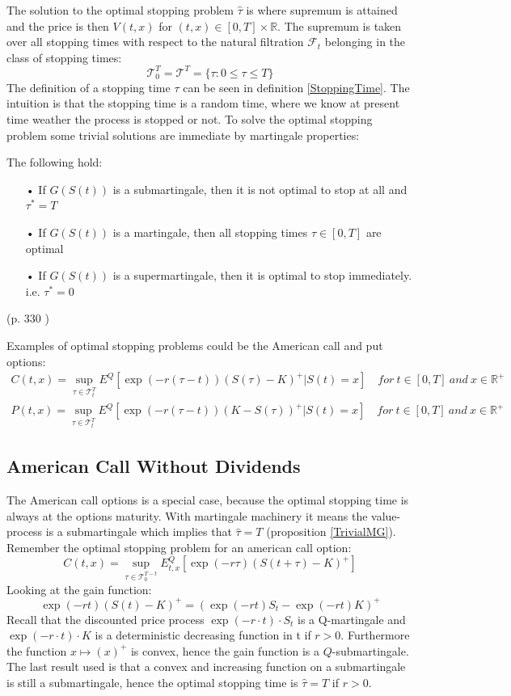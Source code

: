 The solution to the optimal stopping problem $\hat{\tau}$ is where supremum is attained and the price is then $V(t,x)$ for $(t,x)\in [0,T] \times \mathbb{R}$. The supremum is taken over all stopping times with respect to the natural filtration $\mathcal{F}_{t}$ belonging in the class of stopping times:
$$\mathcal{T}_0^T=\mathcal{T}^T=\{\tau : 0 \leq \tau \leq T \}$$
The definition of a stopping time $\tau$ can be seen in definition \ref{StoppingTime}. The intuition is that the stopping time is a random time, where we know at present time weather the process is stopped or not. To solve the optimal stopping problem some trivial solutions are immediate by martingale properties:
\begin{proposition}\label{TrivialMG}
The following hold:
\begin{enumerate}
\item[•] If $G(S(t))$ is a submartingale, then it is not optimal to stop at all and $\tau^*=T$
\item[•] If $G(S(t))$ is a martingale, then all stopping times $\tau\in [0,T]$ are optimal
\item[•] If $G(S(t))$ is a supermartingale, then it is optimal to stop immediately. i.e. $\tau^*=0$
\end{enumerate}
\null \hfill(p. 330 \parencite{finKont})
\end{proposition}

Examples of optimal stopping problems could be the American call and put options:
\begin{align*}
C(t,x)=\sup_{\tau \in \mathcal{T}_t^T} E^Q[\exp(-r(\tau-t)) (S(\tau)-K)^+|S(t)=x] \quad for \ t\in [0,T] \ and \ x\in\mathbb{R}^+\\
P(t,x)=\sup_{\tau \in \mathcal{T}_t^T} E^Q[\exp(-r(\tau-t)) (K-S(\tau))^+|S(t)=x] \quad for \ t\in [0,T] \ and \ x\in\mathbb{R}^+
\end{align*}


\subsection{American Call Without Dividends}\label{AmericanCall}
The American call options is a special case, because the optimal stopping time is always at the options maturity. With martingale machinery it means the value-process is a submartingale which implies that $\hat{\tau}=T$ (proposition \ref{TrivialMG}). Remember the optimal stopping problem for an american call option:
$$C(t,x)=\sup_{\tau \in \mathcal{T}_0^{T-t}} E_{t,x}^Q[\exp(-r\tau) (S(t+\tau)-K)^+]$$
Looking at the gain function:
\begin{equation*}
\exp(-r t) (S(t)-K)^+ = (\exp(-r t) S_{t} - \exp(-r t) K)^+
\end{equation*}
Recall that the discounted price process $\exp(-r\cdot t) \cdot S_t$ is a Q-martingale and $\exp(-r\cdot t) \cdot K$ is a deterministic decreasing function in t if $r>0$. Furthermore the function $x \mapsto (x)^+$ is convex, hence the gain function is a $Q$-submartingale. The last result used is that a convex and increasing function on a submartingale is still a submartingale, hence the optimal stopping time is $\hat{\tau}=T$ if $r>0$.

